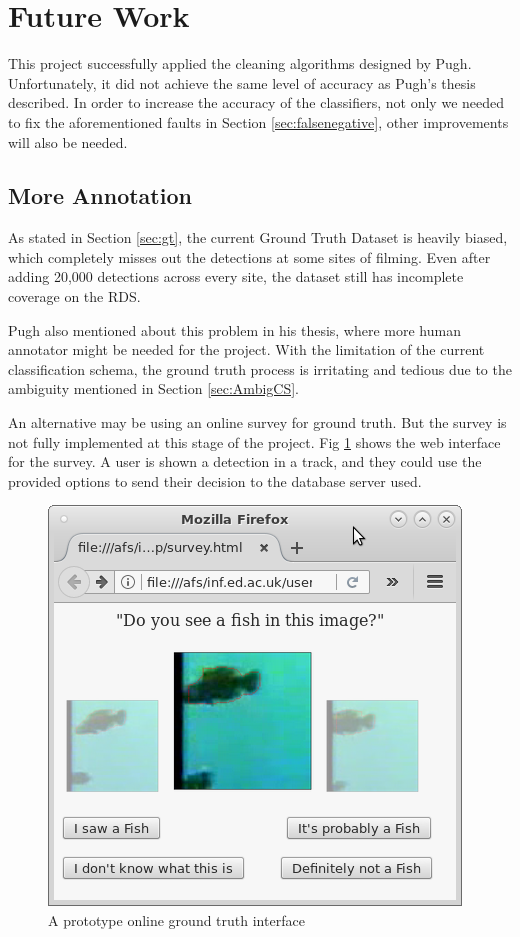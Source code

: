 \documentclass[bsc,logo,twoside,fullspacing,parskip]{infthesis}
\begin{document}
\section{Future Work}
\label{sec:future}

This project successfully applied the cleaning algorithms designed by Pugh\cite{Pugh}. 
Unfortunately, it did not achieve the same level of accuracy as Pugh's thesis described.
In order to increase the accuracy of the classifiers, not only we needed to fix the aforementioned faults in Section \ref{sec:falsenegative}, other improvements will also be needed.

\subsection{More Annotation}

As stated in Section \ref{sec:gt}, the current Ground Truth Dataset is heavily biased, which completely misses out the detections at some sites of filming. 
Even after adding 20,000 detections across every site, the dataset still has incomplete coverage on the RDS. 

Pugh also mentioned about this problem in his thesis, where more human annotator might be needed for the project.
With the limitation of the current classification schema, the ground truth process is irritating and tedious due to the ambiguity mentioned in Section \ref{sec:AmbigCS}.

An alternative may be using an online survey for ground truth. 
But the survey is not fully implemented at this stage of the project. 
Fig \ref{fig:gto} shows the web interface for the survey.
A user is shown a detection in a track, and they could use the provided options to send their decision to the database server used.

\begin{figure}[!h]
    \centering
    \includegraphics[scale=0.5]{graph/query.png}
    \caption{A prototype online ground truth interface}
    \label{fig:gto}
\end{figure}
\end{document}
